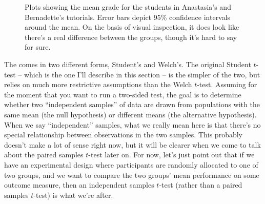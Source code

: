 \begin{figure}[t]
\begin{center}
\caption{Plots showing the mean grade for the students in Anastasia's and Bernadette's tutorials. Error bars depict 95\% confidence intervals around the mean. On the basis of visual inspection, it does look like there's a real difference between the groups, though it's hard to say for sure.}
\HR
\label{fig:ttestci}
\end{center}
\end{figure}


The  comes in two different forms, Student's and Welch's. The original Student $t$-test -- which is the one I'll describe in this section -- is the simpler of the two, but relies on much more restrictive assumptions than the Welch $t$-test. Assuming for the moment that you want to run a two-sided test, the goal is to determine whether two ``independent samples'' of data are drawn from populations with the same mean (the null hypothesis) or different means (the alternative hypothesis). When we say ``independent'' samples, what we really mean here is that there's no special relationship between observations in the two samples. This probably doesn't make a lot of sense right now, but it will be clearer when we come to talk about the paired samples $t$-test later on. For now, let's just point out that if we have an experimental design where participants are randomly allocated to one of two groups, and we want to compare the two groups' mean performance on some outcome measure, then an independent samples $t$-test (rather than a paired samples $t$-test) is what we're after.

